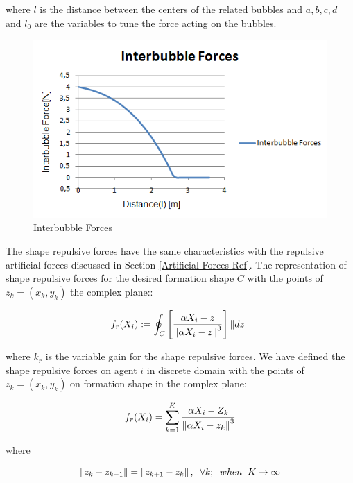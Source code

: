where $l$ is the distance between the centers of the related bubbles and $a,b,c,d$ and $l_0$ are the variables to tune the force acting on the bubbles. 

\begin{figure}[H]
\caption{Interbubble Forces}
\centering
\includegraphics[scale = 0.70]{interbubble_forces}
\end{figure}
	
The shape repulsive forces have the same characteristics with the repulsive artificial forces discussed in Section \ref{Artificial Forces Ref}. The representation of shape repulsive forces for the desired formation shape $C$ with the points of  $z_k = (x_k,y_k)$ the complex plane::
	
\begin{equation} \label{buble_repulsive}
f_r(X_i) := \oint_C \left[\frac{\alpha X_i - z}{\left\lVert\alpha X_i - z\right\rVert^3}\right] \left\lVert dz\right\rVert
\end{equation}

where $k_r$ is the variable gain for the shape repulsive forces. We have defined the shape repulsive forces on agent $i$ in discrete domain with the points of  $z_k = (x_k,y_k)$ on formation shape in the complex plane:

\begin{equation}
f_r(X_i) = \sum_{k=1}^{K} \frac{\alpha X_i - Z_k}{\left\lVert\alpha X_i - z_k\right\rVert^3}
\end{equation}
				
where

\begin{equation}
\left\lVert z_k - z_{k-1}\right\rVert = \left\lVert z_{k+1} - z_k\right\rVert, \hspace{0.2cm}  \forall k ;  \hspace{0.2cm} when  \hspace{0.2cm} K \to\infty
\end{equation}
						

